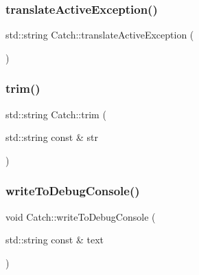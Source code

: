 \mbox{\label{namespace_catch_adafff91485eeeeb9e9333f317cc0e3b1}} 
\subsubsection{\texorpdfstring{translate\+Active\+Exception()}{translateActiveException()}}
{\footnotesize\ttfamily std\+::string Catch\+::translate\+Active\+Exception (\begin{DoxyParamCaption}{ }\end{DoxyParamCaption})}

\mbox{\label{namespace_catch_a084108b47f37d8bfd5db51c50c7451b3}} 
\subsubsection{\texorpdfstring{trim()}{trim()}}
{\footnotesize\ttfamily std\+::string Catch\+::trim (\begin{DoxyParamCaption}\item[{std\+::string const \&}]{str }\end{DoxyParamCaption})}

\mbox{\label{namespace_catch_aa5dcf4750ce9a854f4b74d3c952d13cc}} 
\subsubsection{\texorpdfstring{write\+To\+Debug\+Console()}{writeToDebugConsole()}}
{\footnotesize\ttfamily void Catch\+::write\+To\+Debug\+Console (\begin{DoxyParamCaption}\item[{std\+::string const \&}]{text }\end{DoxyParamCaption})}

